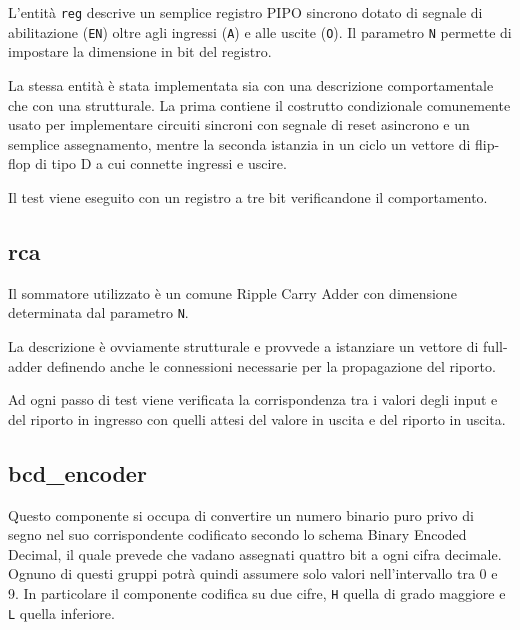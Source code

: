 \documentclass [11pt,a4paper,oneside]{article}
\newcommand{\component}[1]{\texttt{#1}}
\newcommand{\identifier}[1]{\texttt{#1}}
\begin{document}
L'entità \component{reg} descrive un semplice registro PIPO sincrono dotato di 
segnale di abilitazione (\identifier{EN}) oltre agli ingressi (\identifier{A}) e alle
uscite (\identifier{O}). Il parametro \identifier{N} permette di impostare la dimensione
in bit del registro.



La stessa entità è stata implementata sia con una descrizione
comportamentale che con una strutturale. La prima contiene
il costrutto condizionale comunemente usato per implementare
circuiti sincroni con segnale di reset asincrono e un semplice
assegnamento, mentre la seconda istanzia in un ciclo un vettore
di flip-flop di tipo D a cui connette ingressi e uscire.



Il test viene eseguito con un registro a tre bit verificandone
il comportamento.

\subsection{rca}

Il sommatore utilizzato è un comune Ripple Carry Adder con
dimensione determinata dal parametro \identifier{N}.



La descrizione è ovviamente strutturale e provvede a istanziare
un vettore di full-adder definendo anche le connessioni necessarie
per la propagazione del riporto.



Ad ogni passo di test viene verificata la corrispondenza tra i
valori degli input e del riporto in ingresso con quelli attesi
del valore in uscita e del riporto in uscita.

\subsection{bcd\_encoder}

Questo componente si occupa di convertire un numero binario puro privo
di segno nel suo corrispondente codificato secondo lo schema Binary
Encoded Decimal, il quale prevede che vadano assegnati quattro bit  
a ogni cifra decimale. Ognuno di questi gruppi potrà quindi assumere
solo valori nell'intervallo tra 0 e 9. In particolare il componente
codifica su due cifre, \identifier{H} quella di grado maggiore e \identifier{L} quella
inferiore.
\end{document}
